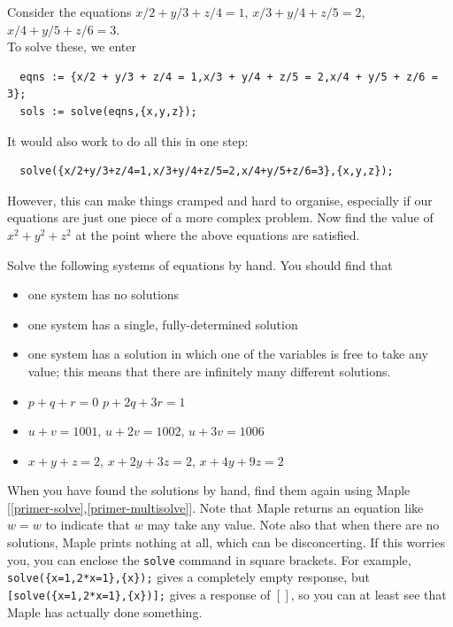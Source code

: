 \documentclass[a4paper,10pt]{amsbook}
\begin{document}
\begin{exercise}\label{ex-hilbert-lineq}
 Consider the equations
  $x/2 + y/3 + z/4 = 1$, \hspace{2em}
  $x/3 + y/4 + z/5 = 2$, \hspace{2em}
  $x/4 + y/5 + z/6 = 3$.\\
 To solve these, we enter
\begin{verbatim}
  eqns := {x/2 + y/3 + z/4 = 1,x/3 + y/4 + z/5 = 2,x/4 + y/5 + z/6 = 3};
  sols := solve(eqns,{x,y,z});
\end{verbatim}
 It would also work to do all this in one step:
\begin{verbatim}
  solve({x/2+y/3+z/4=1,x/3+y/4+z/5=2,x/4+y/5+z/6=3},{x,y,z});
\end{verbatim}
 However, this can make things cramped and hard to organise,
 especially if our equations are just one piece of a more complex
 problem.  Now find the value of $x^2+y^2+z^2$ at the point where the
 above equations are satisfied.
\end{exercise}

\begin{exercise}\label{ex-linear-trichotomy}
 Solve the following systems of equations by hand.  You should find
 that 
 \begin{itemize}
  \item one system has no solutions
  \item one system has a single, fully-determined solution
  \item one system has a solution in which one of the variables is
   free to take any value; this means that there are infinitely many
   different solutions. 
 \end{itemize}
 \begin{itemize}
  \item[(a)] $p +  q +  r = 0$ \hspace{3em}
             $p + 2q + 3r = 1$
  \item[(b)]
    $u + v  = 1001$,  \hspace{2em} 
    $u + 2v = 1002$,  \hspace{2em} 
    $u + 3v = 1006$
  \item[(c)] 
      $x +  y +  z = 2$,  \hspace{2em} 
      $x + 2y + 3z = 2$,  \hspace{2em} 
      $x + 4y + 9z = 2$
 \end{itemize}
 When you have found the solutions by hand, find them again
 using Maple [\ref{primer-solve},\ref{primer-multisolve}].  Note that
 Maple returns an equation like $w=w$ to indicate that $w$
 may take any value.  Note also that when there are no
 solutions, Maple prints nothing at all, which can be
 disconcerting.  If this worries you, you can enclose the
 \verb~solve~ command in square brackets.  For example,
 \verb~solve({x=1,2*x=1},{x});~ gives a completely empty
 response, but \verb~[solve({x=1,2*x=1},{x})];~ gives a
 response of $[]$, so you can at least see that Maple has
 actually done something.
\end{exercise}
\end{document}
